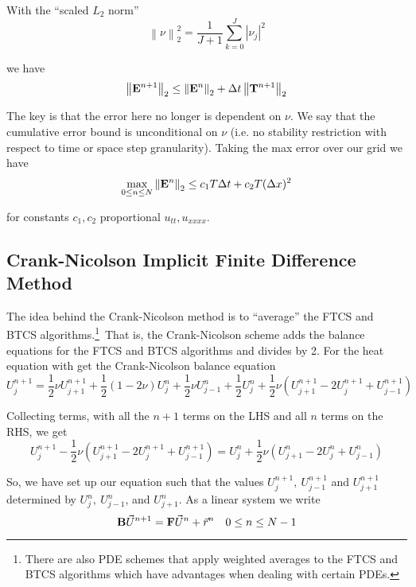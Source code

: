 \documentclass[12pt]{article}
\newcommand\norm[1]{\left\lVert#1\right\rVert} %
\newlength\tindent
\renewcommand{\indent}{\hspace*{\tindent}}
\begin{document}
With the ``scaled $L_2$ norm''
\begin{equation*}
	\norm{\nu}^2_2 = \frac{1}{J + 1} \sum^J_{k = 0} |\nu_j|^2
\end{equation*}

we have
\begin{equation*}
	\norm{ {\bf E}^{n + 1} }_2 \leq \norm{ {\bf E}^n }_2 + \Delta t \norm{ {\bf T}^{n + 1} }_2
\end{equation*}

\indent The key is that the error here no longer is dependent on $\nu$. We say that the cumulative error bound is unconditional on $\nu$ (i.e. no stability restriction with respect to time or space step granularity). Taking the max error over our grid we have
\begin{equation*}
	\max_{0 \leq n \leq N} \norm{ {\bf E}^n }_2 \leq c_1 T\Delta t + c_2 T (\Delta x)^2 
\end{equation*}

for constants $c_1, c_2$ proportional $u_{tt}, u_{xxxx}$.

\subsection{Crank-Nicolson Implicit Finite Difference Method}

\indent The idea behind the Crank-Nicolson method is to ``average'' the FTCS and BTCS algorithms.\footnote{There are also PDE schemes that apply weighted averages to the FTCS and BTCS algorithms which have advantages when dealing with certain PDEs.}~That is, the Crank-Nicolson scheme adds the balance equations for the FTCS and BTCS algorithms and divides by 2. For the heat equation with get the Crank-Nicolson balance equation
\begin{equation*}
	U^{n + 1}_j = \frac{1}{2}\nu U^{n + 1}_{j + 1} + \frac{1}{2}( 1 - 2\nu )U^n_j + \frac{1}{2}\nu U^n_{j - 1} + \frac{1}{2} U^n_j + \frac{1}{2} \nu \left( U^{n + 1}_{j + 1} - 2U^{n + 1}_j + U^{n + 1}_{j - 1} \right)
\end{equation*}

\indent Collecting terms, with all the $n + 1$ terms on the LHS and all $n$ terms on the RHS, we get
\begin{equation*}
	U^{n + 1}_j - \frac{1}{2}\nu \left( U^{n + 1}_{j + 1} - 2U^{n + 1}_j + U^{n + 1}_{j - 1} \right) = U^n_j + \frac{1}{2}\nu \left( U^n_{j + 1} - 2U^n_j + U^n_{j - 1} \right) 
\end{equation*}

\indent So, we have set up our equation such that the values $U^{n + 1}_j,~U^{n + 1}_{j - 1}$ and $U^{n + 1}_{j + 1}$ determined by $U^n_j,~U^n_{j - 1}$, and $U^n_{j + 1}$. As a linear system we write
\begin{equation*}
	{\bf B}\vec{U}^{n + 1} = {\bf F}\vec{U}^n + \vec{r}^n \quad 0 \leq n \leq N - 1
\end{equation*}
\end{document}
